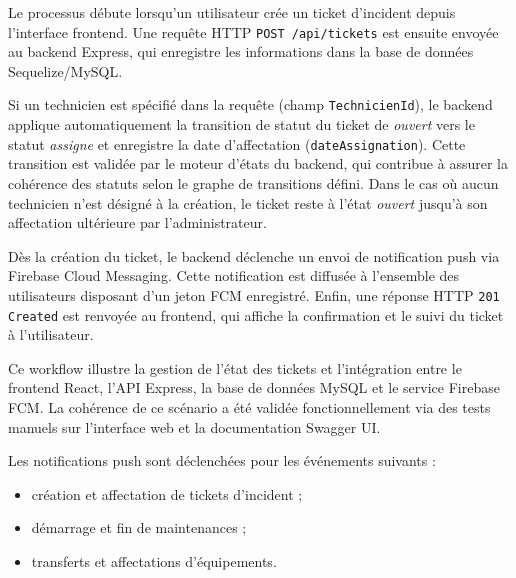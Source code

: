 Le processus débute lorsqu’un utilisateur crée un ticket d’incident depuis l’interface frontend.
Une requête HTTP \texttt{POST /api/tickets} est ensuite envoyée au backend Express,
qui enregistre les informations dans la base de données Sequelize/MySQL.

Si un technicien est spécifié dans la requête (champ \texttt{TechnicienId}), le backend
applique automatiquement la transition de statut du ticket de \textit{ouvert} vers le statut \textit{assigne}
et enregistre la date d'affectation (\texttt{dateAssignation}). Cette transition est validée
par le moteur d'états du backend, qui contribue à assurer la cohérence des statuts
selon le graphe de transitions défini. Dans le cas où aucun technicien n'est désigné à la création,
le ticket reste à l'état \textit{ouvert} jusqu'à son affectation ultérieure par l'administrateur.

Dès la création du ticket, le backend déclenche un envoi de notification push via Firebase Cloud Messaging.
Cette notification est diffusée à l'ensemble des utilisateurs disposant d'un jeton FCM enregistré.
Enfin, une réponse HTTP \texttt{201 Created} est renvoyée au frontend,
qui affiche la confirmation et le suivi du ticket à l'utilisateur.

Ce workflow illustre la gestion de l'état des tickets et l'intégration entre le frontend React,
l'API Express, la base de données MySQL et le service Firebase FCM.
La cohérence de ce scénario a été validée fonctionnellement via des tests manuels
sur l'interface web et la documentation Swagger UI.

Les notifications push sont déclenchées pour les événements suivants :
\begin{itemize}
    \item création et affectation de tickets d'incident ;
    \item démarrage et fin de maintenances ;
    \item transferts et affectations d'équipements.
\end{itemize}

